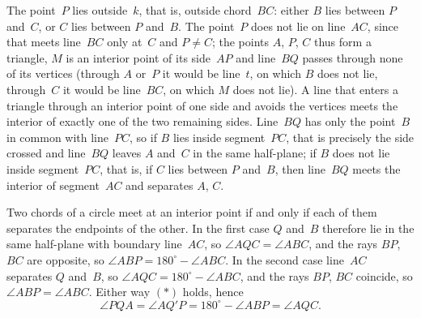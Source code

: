 {    The point~$P$ lies outside~$k$, that is, outside chord~$BC$: either $B$ lies between $P$ and~$C$, or $C$ lies between $P$ and~$B$. The point~$P$ does not lie on line~$AC$, since that meets line~$BC$ only at~$C$ and $P \neq C$; the points $A$, $P$, $C$ thus form a triangle, $M$ is an interior point of its side~$AP$ and line~$BQ$ passes through none of its vertices (through $A$ or~$P$ it would be line~$t$, on which $B$ does not lie, through~$C$ it would be line~$BC$, on which $M$ does not lie). A line that enters a triangle through an interior point of one side and avoids the vertices meets the interior of exactly one of the two remaining sides. Line~$BQ$ has only the point~$B$ in common with line~$PC$, so if $B$ lies inside segment~$PC$, that is precisely the side crossed and line~$BQ$ leaves $A$ and~$C$ in the same half-plane; if $B$ does not lie inside segment~$PC$, that is, if $C$ lies between $P$ and~$B$, then line~$BQ$ meets the interior of segment~$AC$ and separates $A$, $C$.

    Two chords of a circle meet at an interior point if and only if each of them separates the endpoints of the other. In the first case $Q$ and~$B$ therefore lie in the same half-plane with boundary line~$AC$, so $\angle AQC = \angle ABC$, and the rays $BP$, $BC$ are opposite, so $\angle ABP = 180^\circ - \angle ABC$. In the second case line~$AC$ separates $Q$ and~$B$, so $\angle AQC = 180^\circ - \angle ABC$, and the rays $BP$, $BC$ coincide, so $\angle ABP = \angle ABC$. Either way $(*)$ holds, hence
    $$
    \angle PQA = \angle AQ'P = 180^\circ - \angle ABP = \angle AQC.
    $$
}

